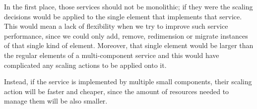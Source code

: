 In the first place, those services should not be monolithic; if they were the scaling decisions would
be applied to the single element that implements that service. This would mean a lack of flexibility
when we try to improve such service performance, since we could only add, remove, redimension or migrate
instances of that single kind of element. Moreover, that single element would be larger than the regular
elements of a multi-component service and this would have complicated any scaling actions to be applied
onto it.

Instead, if the service is implemented by multiple small components, their scaling action will be faster
and cheaper, since the amount of resources needed to manage them will be also smaller.